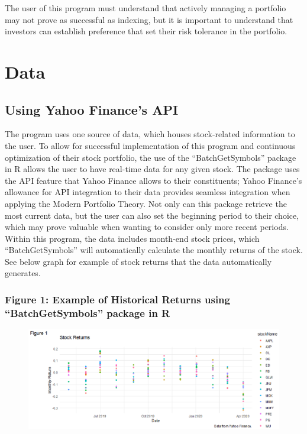 \documentclass[12pt,english]{article}
\begin{document}
\begin{doublespace}
        \indent{}\indent{} 
        The user of this program must understand that actively managing a portfolio may not prove as successful as indexing, but it is important to understand that investors can establish preference that set their risk tolerance in the portfolio.


    \section{Data}\label{sec:data}\indent{}\indent{} %
    
        \subsection{Using Yahoo Finance's API}
        The program uses one source of data, which houses stock-related information to the user. To allow for successful implementation of this program and continuous optimization of their stock portfolio, the use of the “BatchGetSymbols” package in R allows the user to have real-time data for any given stock. The package uses the API feature that Yahoo Finance allows to their constituents; Yahoo Finance’s allowance for API integration to their data provides seamless integration when applying the Modern Portfolio Theory. Not only can this package retrieve the most current data, but the user can also set the beginning period to their choice, which may prove valuable when wanting to consider only more recent periods. Within this program, the data includes month-end stock prices, which “BatchGetSymbols” will automatically calculate the monthly returns of the stock. See below graph for example of stock returns that the data automatically generates.
        
                \subsubsection{Figure 1: Example of Historical Returns using “BatchGetSymbols” package in R}
                    \begin{figure}[H]
                        \begin{center}
                            \includegraphics{FinalProject_Carpenter.eps}
                        \end{center}
                    \end{figure}
                

\end{doublespace}
\end{document}
